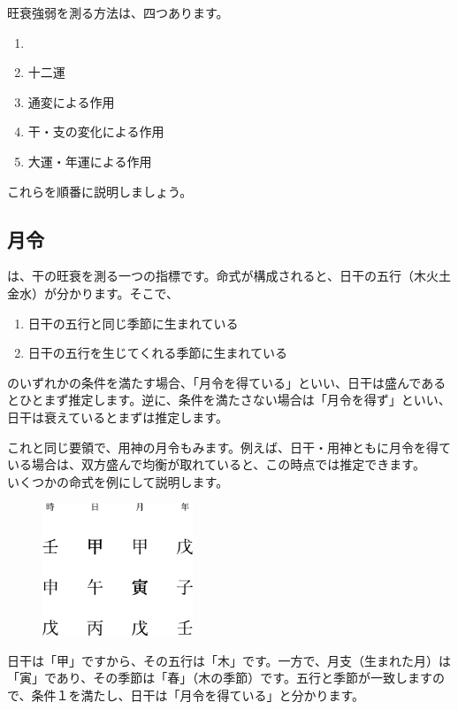 \documentclass[a5paper,11pt,dvipdfmx]{tarticle}
\begin{document}
旺衰強弱を測る方法は、四つあります。

\begin{enumerate}
\item {}
\item 十二運
  \item 通変による作用
\item 干・支の変化による作用
\item 大運・年運による作用
\end{enumerate}

これらを順番に説明しましょう。

\subsection{月令}
は、干の旺衰を測る一つの指標です。命式が構成されると、日干の五行（木火土金水）が分かります。そこで、
\begin{enumerate}
\item 日干の五行と同じ季節に生まれている
\item 日干の五行を生じてくれる季節に生まれている
\end{enumerate}
のいずれかの条件を満たす場合、「月令を得ている」といい、日干は盛んであるとひとまず推定します。逆に、条件を満たさない場合は「月令を得ず」といい、日干は衰えているとまずは推定します。

これと同じ要領で、用神の月令もみます。例えば、日干・用神ともに月令を得ている場合は、双方盛んで均衡が取れていると、この時点では推定できます。\\

いくつかの命式を例にして説明します。

\begin{figure}[h]
  \includegraphics[width=45mm,angle=90]{figs/figure6-1.eps}
\end{figure}

日干は「甲」ですから、その五行は「木」です。一方で、月支（生まれた月）は「寅」であり、その季節は「春」（木の季節）です。五行と季節が一致しますので、条件１を満たし、日干は「月令を得ている」と分かります。
\end{document}

